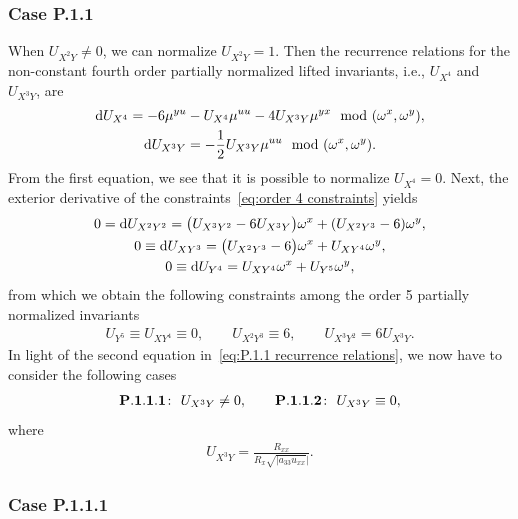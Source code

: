 \documentclass[10pt,a4paper]{amsart}
\numberwithin{equation}{section}
\begin{document}
\subsubsection{Case P.1.1}

When $U_{X^2Y}\neq 0$, we can normalize $U_{X^2Y}=1$. Then the recurrence relations for the non-constant fourth order partially normalized lifted invariants, i.e., $U_{X^4}$ and $U_{X^3Y}$, are
\begin{gather}
{\rm d}U_{X^4} = - 6\mu^{yu} - U_{X^4}\mu^{uu}-4U_{X^3Y}\mu^{yx}\mod(\omega^x,\omega^y),\nonumber
\\
%
{\rm d}U_{X^3Y} = -\frac{1}{2}U_{X^3Y}\mu^{uu}
 \mod(\omega^x,\omega^y).
\label{eq:P.1.1 recurrence relations}
\end{gather}
%
From the first equation, we see that it is possible to normalize $U_{X^4}=0$. Next, the exterior derivative of the constraints~\eqref{eq:order 4 constraints} yields
%
\begin{gather*}
0 = {\rm d}U_{X^2Y^2} = \big(U_{X^3Y^2}-6U_{X^3Y}\big)\omega^x+(U_{X^2Y^3}-6)\omega^y,\\
0 \equiv {\rm d}U_{XY^3} = \big(U_{X^2Y^3}-6\big)\omega^x + U_{XY^4}\omega^y,\\
0 \equiv {\rm d}U_{Y^4} = U_{XY^4}\omega^x + U_{Y^5}\omega^y,
\end{gather*}
%
from which we obtain the following constraints among the order 5 partially normalized invariants
%
\begin{gather}\label{eq:P.1.1 constraints}
U_{Y^5}\equiv U_{XY^4} \equiv 0,\qquad U_{X^2Y^3}\equiv 6,\qquad U_{X^3Y^2} = 6U_{X^3Y}.
\end{gather}
%
In light of the second equation in~\eqref{eq:P.1.1 recurrence relations}, we now have to consider the following cases
\begin{gather*}
{\bf P.1.1.1}\colon\ U_{X^3Y}\neq 0,\qquad
{\bf P.1.1.2}\colon\ U_{X^3Y}\equiv 0,
\end{gather*}
where
\begin{gather*}
U_{X^3Y} = \frac{R_{xx}}{R_x \sqrt{|a_{33}u_{xx}}|}.
\end{gather*}


\subsubsection{Case P.1.1.1}
\end{document}
